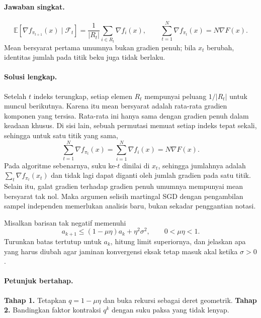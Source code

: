 \paragraph{Jawaban singkat.}
\label{orig03:ps04:answer:0004}
\[
 \mathbb E[\nabla f_{\pi_{t+1}}(x)\mid\mathcal F_t]
 =\frac1{|R_t|}\sum_{i\in R_t}\nabla f_i(x),
 \qquad
 \sum_{t=1}^N\nabla f_{\pi_t}(x)=N\nabla F(x).
\]
Mean bersyarat pertama umumnya bukan gradien penuh; bila $x_t$ berubah,
identitas jumlah pada titik beku juga tidak berlaku.

\paragraph{Solusi lengkap.}
\label{orig03:ps04:solution:0004}
Setelah $t$ indeks terungkap, setiap elemen $R_t$ mempunyai peluang
$1/|R_t|$ untuk muncul berikutnya. Karena itu mean bersyarat adalah rata-rata
gradien komponen yang tersisa. Rata-rata ini hanya sama dengan gradien penuh
dalam keadaan khusus. Di sisi lain, sebuah permutasi memuat setiap indeks
tepat sekali, sehingga untuk satu titik yang sama,
\[
 \sum_{t=1}^N\nabla f_{\pi_t}(x)=\sum_{i=1}^N\nabla f_i(x)=N\nabla F(x).
\]
Pada algoritme sebenarnya, suku ke-$t$ dinilai di $x_t$, sehingga jumlahnya
adalah $\sum_t\nabla f_{\pi_t}(x_t)$ dan tidak lagi dapat diganti oleh jumlah
gradien pada satu titik. Selain itu, galat gradien terhadap gradien penuh
umumnya mempunyai mean bersyarat tak nol. Maka argumen selisih martingal SGD
dengan pengambilan sampel independen memerlukan analisis baru, bukan sekadar
penggantian notasi.

\begin{exercise}
\label{orig03:ps04:exercise:0005}
Misalkan barisan tak negatif memenuhi
\[
 a_{k+1}\le(1-\mu\eta)a_k+\eta^2\sigma^2,
 \qquad 0<\mu\eta<1.
\]
Turunkan batas tertutup untuk $a_k$, hitung limit superiornya, dan jelaskan
apa yang harus diubah agar jaminan konvergensi eksak tetap masuk akal ketika
$\sigma>0$.
\end{exercise}

\paragraph{Petunjuk bertahap.}
\label{orig03:ps04:hint:0005}
\textbf{Tahap 1.} Tetapkan $q=1-\mu\eta$ dan buka rekursi sebagai deret
geometrik.
\textbf{Tahap 2.} Bandingkan faktor kontraksi $q^k$ dengan suku paksa yang
tidak lenyap.

